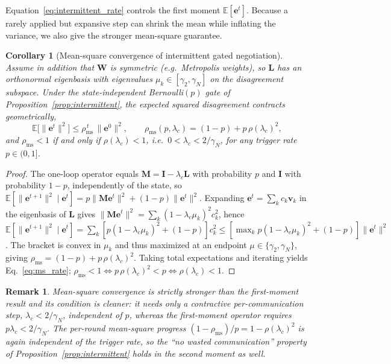 \documentclass[conference]{IEEEtran}
\newtheorem{corollary}{Corollary}
\newtheorem{remark}{Remark}
\begin{document}
Equation~\eqref{eq:intermittent_rate} controls the first moment $\mathbb{E}[\mathbf{e}^t]$. Because a rarely applied but expansive step can shrink the mean while inflating the variance, we also give the stronger mean-square guarantee.

\begin{corollary}[Mean-square convergence of intermittent gated negotiation]\label{cor:intermittent_ms}
Assume in addition that $\mathbf{W}$ is symmetric (e.g.\ Metropolis weights), so $\mathbf{L}$ has an orthonormal eigenbasis with eigenvalues $\mu_k\in[\gamma_2,\gamma_N]$ on the disagreement subspace. Under the state-independent Bernoulli$(p)$ gate of Proposition~\ref{prop:intermittent}, the expected squared disagreement contracts geometrically,
\begin{equation}
\mathbb{E}\big[\|\mathbf{e}^{t}\|^2\big]\le \rho_{\mathrm{ms}}^{\,t}\,\|\mathbf{e}^{0}\|^2,\qquad
\rho_{\mathrm{ms}}(p,\lambda_c)=(1-p)+p\,\rho(\lambda_c)^2,
\label{eq:ms_rate}
\end{equation}
and $\rho_{\mathrm{ms}}<1$ if and only if $\rho(\lambda_c)<1$, i.e.\ $0<\lambda_c<2/\gamma_N$, for \emph{any} trigger rate $p\in(0,1]$.
\end{corollary}
\begin{proof}
The one-loop operator equals $\mathbf{M}=\mathbf{I}-\lambda_c\mathbf{L}$ with probability $p$ and $\mathbf{I}$ with probability $1-p$, independently of the state, so $\mathbb{E}[\|\mathbf{e}^{t+1}\|^2\mid\mathbf{e}^t]=p\|\mathbf{M}\mathbf{e}^t\|^2+(1-p)\|\mathbf{e}^t\|^2$. Expanding $\mathbf{e}^t=\sum_k c_k\mathbf{v}_k$ in the eigenbasis of $\mathbf{L}$ gives $\|\mathbf{M}\mathbf{e}^t\|^2=\sum_k(1-\lambda_c\mu_k)^2c_k^2$, hence $\mathbb{E}[\|\mathbf{e}^{t+1}\|^2\mid\mathbf{e}^t]=\sum_k[p(1-\lambda_c\mu_k)^2+(1-p)]c_k^2\le[\max_k p(1-\lambda_c\mu_k)^2+(1-p)]\|\mathbf{e}^t\|^2$. The bracket is convex in $\mu_k$ and thus maximized at an endpoint $\mu\in\{\gamma_2,\gamma_N\}$, giving $\rho_{\mathrm{ms}}=(1-p)+p\,\rho(\lambda_c)^2$. Taking total expectations and iterating yields Eq.~\eqref{eq:ms_rate}; $\rho_{\mathrm{ms}}<1\Leftrightarrow p\,\rho(\lambda_c)^2<p\Leftrightarrow\rho(\lambda_c)<1$.
\end{proof}
\begin{remark}
Mean-square convergence is strictly stronger than the first-moment result and its condition is cleaner: it needs only a contractive per-communication step, $\lambda_c<2/\gamma_N$, independent of $p$, whereas the first-moment operator requires $p\lambda_c<2/\gamma_N$. The per-round mean-square progress $(1-\rho_{\mathrm{ms}})/p=1-\rho(\lambda_c)^2$ is again independent of the trigger rate, so the ``no wasted communication'' property of Proposition~\ref{prop:intermittent} holds in the second moment as well.
\end{remark}
\end{document}
